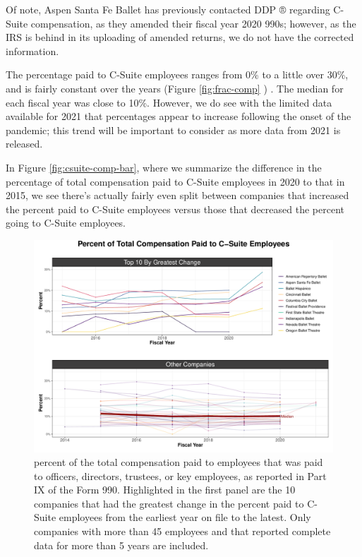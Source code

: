 \documentclass[Dance Data
Project,article,submit,moreauthors,pdftex]{mdpi}
\begin{document}
Of note, Aspen Santa Fe Ballet has previously contacted DDP ® regarding
C-Suite compensation, as they amended their fiscal year 2020 990s;
however, as the IRS is behind in its uploading of amended returns, we do
not have the corrected information.

The percentage paid to C-Suite employees ranges from 0\% to a little
over 30\%, and is fairly constant over the years (Figure
\ref{fig:frac-comp} ) . The median for each fiscal year was close to
10\%. However, we do see with the limited data available for 2021 that
percentages appear to increase following the onset of the pandemic; this
trend will be important to consider as more data from 2021 is released.

In Figure \ref{fig:csuite-comp-bar}, where we summarize the difference
in the percentage of total compensation paid to C-Suite employees in
2020 to that in 2015, we see there's actually fairly even split between
companies that increased the percent paid to C-Suite employees versus
those that decreased the percent going to C-Suite employees.

\begin{figure}[H]
\includegraphics[width=0.9\linewidth,]{../images/frac-comp} \caption{\label{fig:frac-comp} percent of the total compensation paid to employees that was paid to officers, directors, trustees, or key employees, as reported in Part IX of the Form 990. Highlighted in the first panel are the 10 companies that had the greatest change in the percent paid to C-Suite employees from the earliest year on file to the latest. Only companies with more than 45 employees and that reported complete data for more than 5 years are included.}\label{fig:unnamed-chunk-17}
\end{figure}
\end{document}
